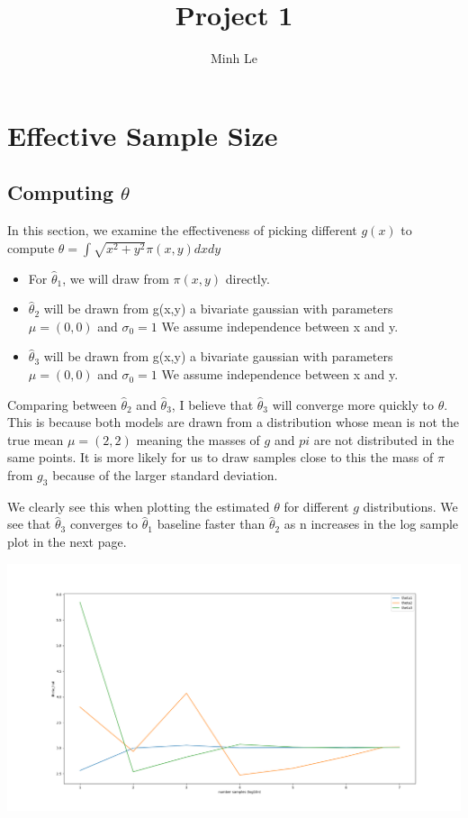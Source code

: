 \documentclass[12pt]{article}
\begin{document}
  
\title{Project 1}
\author{Minh Le}


\section{Effective Sample Size}
\subsection{Computing $\theta$}

In this section, we examine the effectiveness of picking different $g(x)$ to compute $\theta = \int \sqrt{x^2 + y^2}\pi(x,y)dxdy$ 

\begin{itemize}
  \item For $\hat{\theta}_1$, we will draw from $\pi(x,y)$ directly.
  
  \item $\hat{\theta}_2$ will be drawn from g(x,y) a bivariate gaussian with parameters $\mu = (0,0)$ and $\sigma_0 = 1$ We assume independence between x and y.
  
  \item $\hat{\theta}_3$ will be drawn from g(x,y) a bivariate gaussian with parameters $\mu = (0,0)$ and $\sigma_0 = 1$ We assume independence between x and y.
\end{itemize}

Comparing between $\hat{\theta}_2$ and $\hat{\theta}_3$, I believe that $\hat{\theta}_3$ will converge more quickly to $\theta$. This is because both models are drawn from a distribution whose mean is not the true mean $\mu=(2,2)$ meaning the masses of $g$ and $pi$ are not distributed in the same points. It is more likely for us to draw samples close to this the mass of $\pi$ from $g_3$ because of the larger standard deviation.  

We clearly see this when plotting the estimated $\theta$ for different $g$ distributions. We see that $\hat{\theta}_3$ converges to $\hat{\theta}_1$ baseline faster than $\hat{\theta}_2$ as n increases in the log sample plot in the next page.

\includegraphics[scale=.25]{problem1_samples}
	
\end{document}
